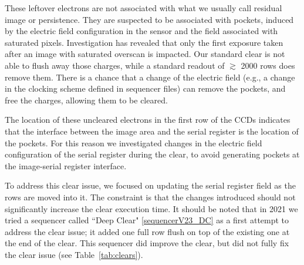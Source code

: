 These leftover electrons are not associated with what we usually call residual image or persistence. They are suspected to be associated with pockets, induced by the electric field configuration in the sensor and the field associated with saturated pixels.
Investigation has revealed that only the first exposure taken after an image with saturated overscan is impacted. Our standard clear is not able to flush away those charges, while a standard readout of $\gtrsim$ 2000 rows does remove them.
There is a chance that a change of the electric field (e.g., a change in the clocking scheme defined in sequencer files) can remove the pockets, and free the charges, allowing them to be cleared.

The location of these uncleared electrons in the first row of the
CCDs indicates that the interface between the image area and the serial register
is the location of the pockets. For this reason we investigated
changes in the electric field configuration of the serial register during the
clear, to avoid generating pockets at the image-serial register interface.


To address this clear issue, we focused on updating the serial
register field as the rows are moved into it. The constraint is that
the changes introduced should not significantly increase the clear
execution time. It should be noted that in 2021 we tried a sequencer
called ``Deep Clear" \hyperref[sequencerV23_DC]{{[}sequencerV23\_DC{]}} as a first attempt to address the clear issue; it added one full row 
flush on top of the existing one at the end of the clear. This sequencer
did improve the clear, but did  not fully fix the clear issue (see
Table~\ref{tab:clears}).

